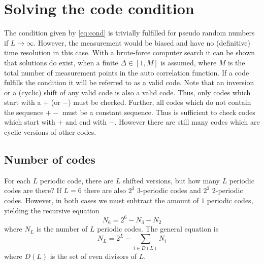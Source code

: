 \documentclass[18pt,a4paper]{extarticle}
\begin{document}
\section{Solving the code condition}
The condition given by \eqref{eq:cond} is trivially fulfilled for pseudo random numbers if $L \rightarrow \infty$.
However, the measurement would be biased and have no (definitive) time resolution in this case.
With a brute-force computer search it can be shown that solutions do exist, when a finite $\Delta \in [1, M]$ is assumed, where $M$ is the total number of measurement points in the auto correlation function.
If a code fulfills the condition it will be referred to as a valid code.
Note that an inversion or a (cyclic) shift of any valid code is also a valid code.
Thus, only codes which start with a $+$ (or $-$) must be checked.
Further, all codes which do not contain the sequence $+-$ must be a constant sequence.
Thus is sufficient to check codes which start with $+$ and end with $-$.
However there are still many codes which are cyclic versions of other codes.

\subsection{Number of codes}
For each $L$ periodic code, there are $L$ shifted versions, but how many $L$ periodic codes are there?
If $L=6$ there are also $2^3$ $3$-periodic codes and $2^2$ $2$-periodic codes.
However, in both cases we must subtract the amount of $1$ periodic codes, yielding the recursive equation
\begin{equation}
N_6 = 2^6 - N_3 - N_2
\end{equation}
where $N_L$ is the number of $L$ periodic codes.
The general equation is
\begin{equation}
N_L = 2^L - \sum_{i \in D(L)} N_i
\end{equation}
where $D(L)$ is the set of even divisors of $L$.
\end{document}
